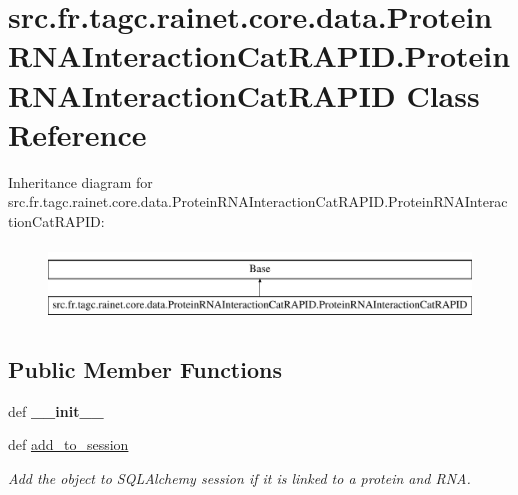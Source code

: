 \hypertarget{classsrc_1_1fr_1_1tagc_1_1rainet_1_1core_1_1data_1_1ProteinRNAInteractionCatRAPID_1_1ProteinRNAInteractionCatRAPID}{\section{src.\-fr.\-tagc.\-rainet.\-core.\-data.\-Protein\-R\-N\-A\-Interaction\-Cat\-R\-A\-P\-I\-D.\-Protein\-R\-N\-A\-Interaction\-Cat\-R\-A\-P\-I\-D Class Reference}
\label{classsrc_1_1fr_1_1tagc_1_1rainet_1_1core_1_1data_1_1ProteinRNAInteractionCatRAPID_1_1ProteinRNAInteractionCatRAPID}
}
Inheritance diagram for src.\-fr.\-tagc.\-rainet.\-core.\-data.\-Protein\-R\-N\-A\-Interaction\-Cat\-R\-A\-P\-I\-D.\-Protein\-R\-N\-A\-Interaction\-Cat\-R\-A\-P\-I\-D\-:\begin{figure}[H]
\begin{center}
\leavevmode
\includegraphics[height=2.000000cm]{classsrc_1_1fr_1_1tagc_1_1rainet_1_1core_1_1data_1_1ProteinRNAInteractionCatRAPID_1_1ProteinRNAInteractionCatRAPID}
\end{center}
\end{figure}
\subsection*{Public Member Functions}
\begin{DoxyCompactItemize}
\item 
\hypertarget{classsrc_1_1fr_1_1tagc_1_1rainet_1_1core_1_1data_1_1ProteinRNAInteractionCatRAPID_1_1ProteinRNAInteractionCatRAPID_a754fa5913b46de160af5d93b50100b8e}{def {\bfseries \-\_\-\-\_\-init\-\_\-\-\_\-}}\label{classsrc_1_1fr_1_1tagc_1_1rainet_1_1core_1_1data_1_1ProteinRNAInteractionCatRAPID_1_1ProteinRNAInteractionCatRAPID_a754fa5913b46de160af5d93b50100b8e}

\item 
\hypertarget{classsrc_1_1fr_1_1tagc_1_1rainet_1_1core_1_1data_1_1ProteinRNAInteractionCatRAPID_1_1ProteinRNAInteractionCatRAPID_a5b13ea2b4014ec2a7cbd1e75301bcb98}{def \hyperlink{classsrc_1_1fr_1_1tagc_1_1rainet_1_1core_1_1data_1_1ProteinRNAInteractionCatRAPID_1_1ProteinRNAInteractionCatRAPID_a5b13ea2b4014ec2a7cbd1e75301bcb98}{add\-\_\-to\-\_\-session}}\label{classsrc_1_1fr_1_1tagc_1_1rainet_1_1core_1_1data_1_1ProteinRNAInteractionCatRAPID_1_1ProteinRNAInteractionCatRAPID_a5b13ea2b4014ec2a7cbd1e75301bcb98}

\begin{DoxyCompactList}\small\item\em Add the object to S\-Q\-L\-Alchemy session if it is linked to a protein and R\-N\-A. \end{DoxyCompactList}\end{DoxyCompactItemize}
